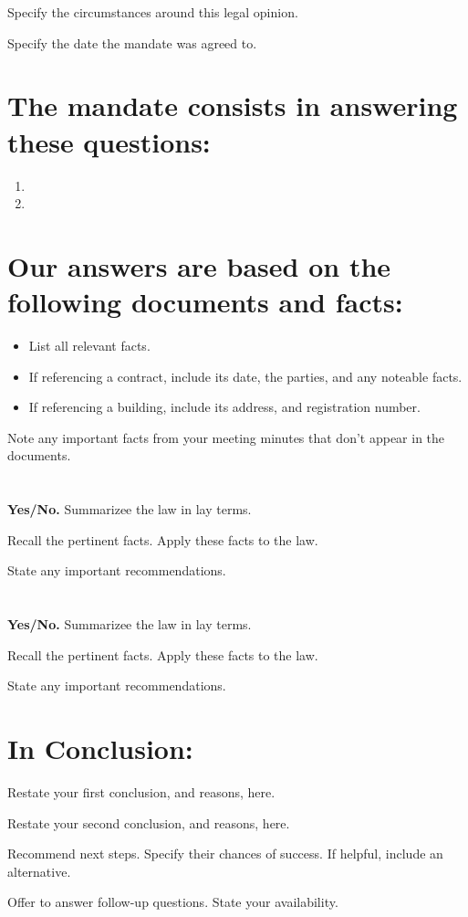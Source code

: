 Specify the circumstances around this legal opinion. 

Specify the date the mandate was agreed to.

\section*{The mandate consists in answering these questions:}
\begin{enumerate}
  \item \firstQuestion
  \item \secondQuestion
\end{enumerate}

\section*{Our answers are based on the following documents and facts:}
\begin{itemize}
  \item List all relevant facts.
  \item If referencing a contract, include its date, the parties, and any noteable facts.
  \item If referencing a building, include its address, and registration number.
\end{itemize}

Note any important facts from your meeting minutes that don't appear in the documents.

\section*{\textbf{\firstQuestion}}
\textbf{Yes/No.} Summarizee the law in lay terms. 

Recall the pertinent facts. Apply these facts to the law. 

State any important recommendations. 

\section*{\textbf{\secondQuestion}}
\textbf{Yes/No.} Summarizee the law in lay terms. 

Recall the pertinent facts. Apply these facts to the law. 

State any important recommendations. 

\section*{\textbf{In Conclusion:}}
Restate your first conclusion, and reasons, here.

Restate your second conclusion, and reasons, here.

Recommend next steps. Specify their chances of success. If helpful, include an alternative.

Offer to answer follow-up questions. State your availability.